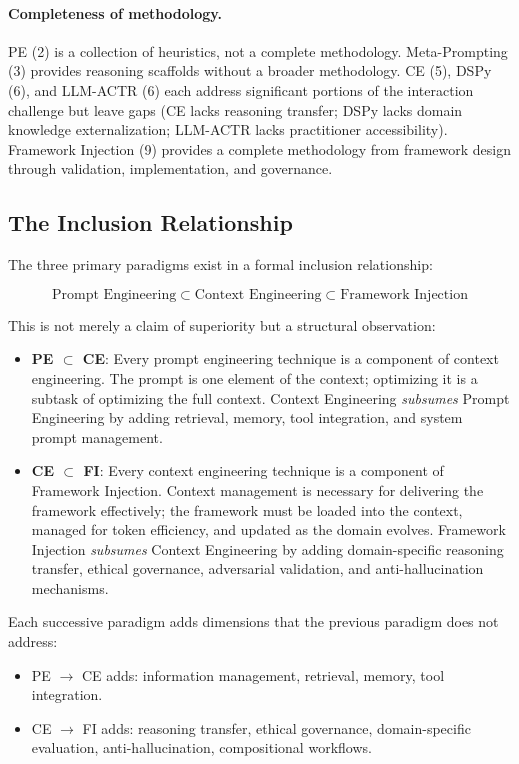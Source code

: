 \documentclass[12pt,a4paper]{article}
\begin{document}
\paragraph{Completeness of methodology.}
PE (2) is a collection of heuristics, not a complete methodology. Meta-Prompting (3) provides reasoning scaffolds without a broader methodology. CE (5), DSPy (6), and LLM-ACTR (6) each address significant portions of the interaction challenge but leave gaps (CE lacks reasoning transfer; DSPy lacks domain knowledge externalization; LLM-ACTR lacks practitioner accessibility). Framework Injection (9) provides a complete methodology from framework design through validation, implementation, and governance.

\subsection{The Inclusion Relationship}
\label{sec:comparison:inclusion}

The three primary paradigms exist in a formal inclusion relationship:

\begin{equation}
\text{Prompt Engineering} \subset \text{Context Engineering} \subset \text{Framework Injection}
\end{equation}

This is not merely a claim of superiority but a structural observation:

\begin{itemize}
    \item \textbf{PE $\subset$ CE}: Every prompt engineering technique is a component of context engineering. The prompt is one element of the context; optimizing it is a subtask of optimizing the full context. Context Engineering \emph{subsumes} Prompt Engineering by adding retrieval, memory, tool integration, and system prompt management.

    \item \textbf{CE $\subset$ FI}: Every context engineering technique is a component of Framework Injection. Context management is necessary for delivering the framework effectively; the framework must be loaded into the context, managed for token efficiency, and updated as the domain evolves. Framework Injection \emph{subsumes} Context Engineering by adding domain-specific reasoning transfer, ethical governance, adversarial validation, and anti-hallucination mechanisms.
\end{itemize}

Each successive paradigm adds dimensions that the previous paradigm does not address:
\begin{itemize}
    \item PE $\rightarrow$ CE adds: information management, retrieval, memory, tool integration.
    \item CE $\rightarrow$ FI adds: reasoning transfer, ethical governance, domain-specific evaluation, anti-hallucination, compositional workflows.
\end{itemize}
\end{document}
